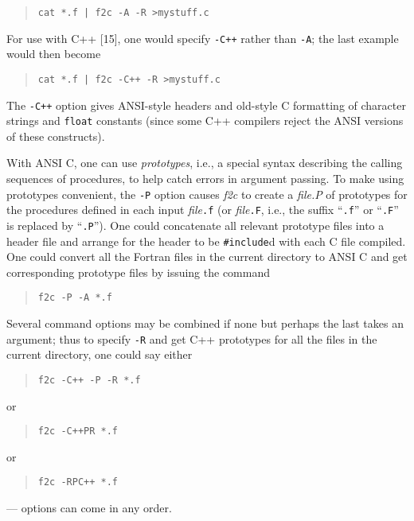 \documentclass[12pt]{article}
\begin{document}
\begin{quote}
\begin{verbatim}
cat *.f | f2c -A -R >mystuff.c
\end{verbatim}
\end{quote}
For use with C++ [15], one would specify \verb|-C++| rather than \verb|-A|; the last example would then become
\begin{quote}
\begin{verbatim}
cat *.f | f2c -C++ -R >mystuff.c
\end{verbatim}
\end{quote}
The \verb|-C++| option gives ANSI-style headers and old-style C formatting of character strings and \verb|float| constants (since some C++ compilers reject the ANSI versions of these constructs).

\noindent
With ANSI C, one can use \emph{prototypes}, i.e., a special syntax describing the calling sequences of procedures, to help catch errors in argument passing. To make using prototypes convenient, the \verb|-P| option causes \emph{f2c} to create a \emph{file.P} of prototypes for the procedures defined in each input \emph{file}\verb|.f| (or \emph{file}\verb|.F|, i.e., the suffix ``\verb|.f|'' or ``\verb|.F|'' is replaced by ``\verb|.P|''). One could concatenate all relevant prototype files into a header file and arrange for the header to be \verb|#include|d with each C file compiled. One could convert all the Fortran files in the current directory to ANSI C and get corresponding prototype files by issuing the command
\begin{quote}
\begin{verbatim}
f2c -P -A *.f
\end{verbatim}
\end{quote}
Several command options may be combined if none but perhaps the last takes an argument; thus to specify \verb|-R| and get C++ prototypes for all the files in the current directory, one could say either
\begin{quote}
\begin{verbatim}
f2c -C++ -P -R *.f
\end{verbatim}
\end{quote}
or
\begin{quote}
\begin{verbatim}
f2c -C++PR *.f
\end{verbatim}
\end{quote}
or
\begin{quote}
\begin{verbatim}
f2c -RPC++ *.f
\end{verbatim}
\end{quote}
--- options can come in any order.
\end{document}

